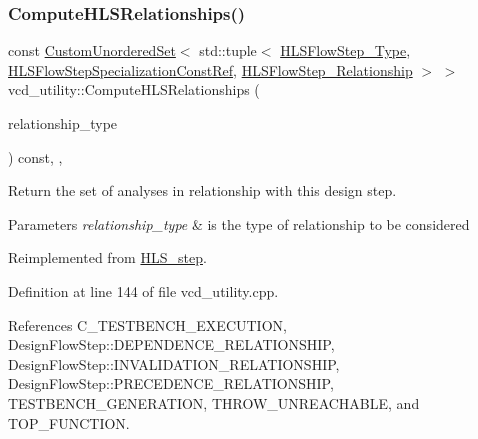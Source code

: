 \subsubsection{\texorpdfstring{Compute\+H\+L\+S\+Relationships()}{ComputeHLSRelationships()}}
{\footnotesize\ttfamily const \hyperlink{classCustomUnorderedSet}{Custom\+Unordered\+Set}$<$ std\+::tuple$<$ \hyperlink{hls__step_8hpp_ada16bc22905016180e26fc7e39537f8d}{H\+L\+S\+Flow\+Step\+\_\+\+Type}, \hyperlink{hls__step_8hpp_a5fdd2edf290c196531d21d68e13f0e74}{H\+L\+S\+Flow\+Step\+Specialization\+Const\+Ref}, \hyperlink{hls__step_8hpp_a3ad360b9b11e6bf0683d5562a0ceb169}{H\+L\+S\+Flow\+Step\+\_\+\+Relationship} $>$ $>$ vcd\+\_\+utility\+::\+Compute\+H\+L\+S\+Relationships (\begin{DoxyParamCaption}\item[{const \hyperlink{classDesignFlowStep_a723a3baf19ff2ceb77bc13e099d0b1b7}{Design\+Flow\+Step\+::\+Relationship\+Type}}]{relationship\+\_\+type }\end{DoxyParamCaption}) const\hspace{0.3cm}{\ttfamily [override]}, {\ttfamily [protected]}, {\ttfamily [virtual]}}



Return the set of analyses in relationship with this design step. 


\begin{DoxyParams}{Parameters}
{\em relationship\+\_\+type} & is the type of relationship to be considered \\
\hline
\end{DoxyParams}


Reimplemented from \hyperlink{classHLS__step_aed0ce8cca9a1ef18e705fc1032ad4de5}{H\+L\+S\+\_\+step}.



Definition at line 144 of file vcd\+\_\+utility.\+cpp.



References C\+\_\+\+T\+E\+S\+T\+B\+E\+N\+C\+H\+\_\+\+E\+X\+E\+C\+U\+T\+I\+ON, Design\+Flow\+Step\+::\+D\+E\+P\+E\+N\+D\+E\+N\+C\+E\+\_\+\+R\+E\+L\+A\+T\+I\+O\+N\+S\+H\+IP, Design\+Flow\+Step\+::\+I\+N\+V\+A\+L\+I\+D\+A\+T\+I\+O\+N\+\_\+\+R\+E\+L\+A\+T\+I\+O\+N\+S\+H\+IP, Design\+Flow\+Step\+::\+P\+R\+E\+C\+E\+D\+E\+N\+C\+E\+\_\+\+R\+E\+L\+A\+T\+I\+O\+N\+S\+H\+IP, T\+E\+S\+T\+B\+E\+N\+C\+H\+\_\+\+G\+E\+N\+E\+R\+A\+T\+I\+ON, T\+H\+R\+O\+W\+\_\+\+U\+N\+R\+E\+A\+C\+H\+A\+B\+LE, and T\+O\+P\+\_\+\+F\+U\+N\+C\+T\+I\+ON.

\mbox{\label{classvcd__utility_a97b5e66d24f1509be52266177627c391}} 
